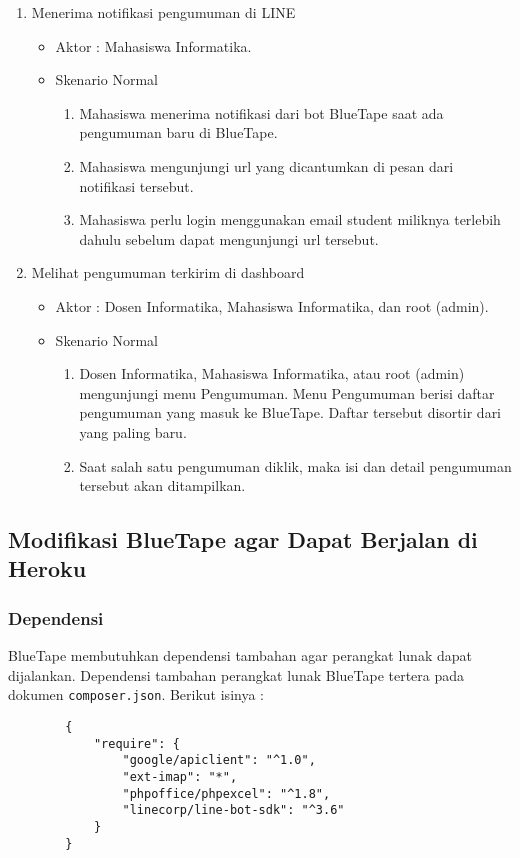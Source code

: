 \begin{enumerate}
\item Menerima notifikasi pengumuman di LINE

\begin{itemize}
	\item Aktor : Mahasiswa Informatika.
	\item Skenario Normal

	\begin{enumerate}
		\item Mahasiswa menerima notifikasi dari bot BlueTape saat ada pengumuman baru di BlueTape.
		\item Mahasiswa mengunjungi url yang dicantumkan di pesan dari notifikasi tersebut. 
		\item Mahasiswa perlu login menggunakan email student miliknya terlebih dahulu sebelum dapat mengunjungi url tersebut.
	\end{enumerate}
\end{itemize}

\item Melihat pengumuman terkirim di dashboard

\begin{itemize}
	\item Aktor : Dosen Informatika, Mahasiswa Informatika, dan root (admin).
	\item Skenario Normal

	\begin{enumerate}
		\item Dosen Informatika, Mahasiswa Informatika, atau root (admin) mengunjungi menu Pengumuman. Menu Pengumuman berisi daftar pengumuman yang masuk ke BlueTape. Daftar tersebut disortir dari yang paling baru.
		\item Saat salah satu pengumuman diklik, maka isi dan detail pengumuman tersebut akan ditampilkan.
	\end{enumerate}
\end{itemize}
\end{enumerate}

\subsection{Modifikasi BlueTape agar Dapat Berjalan di Heroku}
	\subsubsection{Dependensi}
		BlueTape membutuhkan dependensi tambahan agar perangkat lunak dapat dijalankan. Dependensi tambahan perangkat lunak BlueTape tertera pada dokumen \texttt{composer.json}. Berikut isinya :
		\begin{lstlisting}
		{
		    "require": {
		        "google/apiclient": "^1.0",
				"ext-imap": "*",
		        "phpoffice/phpexcel": "^1.8",
		        "linecorp/line-bot-sdk": "^3.6"
		    }
		}
		\end{lstlisting}
		
